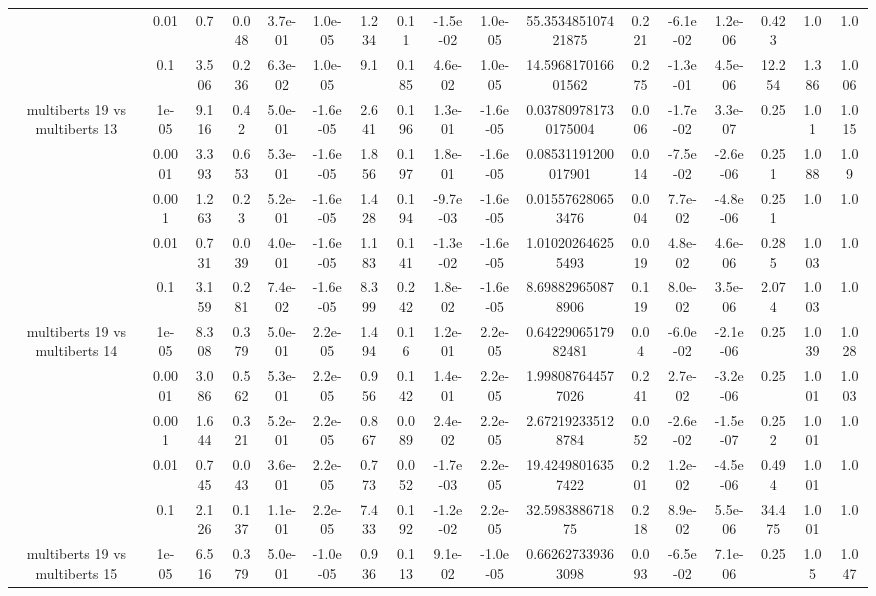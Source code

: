 \begin{tabular}{|c|c|c|c|c|c|c|c|c|c|c|c|c|c|c|c|c|}
 & 0.01 & 0.7 & 0.048 & 3.7e-01 & 1.0e-05 & 1.234 & 0.11 & -1.5e-02 & 1.0e-05 & 55.353485107421875 & 0.221 & -6.1e-02 & 1.2e-06 & 0.423 & 1.0 & 1.0 \\
 & 0.1 & 3.506 & 0.236 & 6.3e-02 & 1.0e-05 & 9.1 & 0.185 & 4.6e-02 & 1.0e-05 & 14.596817016601562 & 0.275 & -1.3e-01 & 4.5e-06 & 12.254 & 1.386 & 1.006 \\
\hline
\multirow{5}{*}{multiberts 19 vs multiberts 13} & 1e-05 & 9.116 & 0.42 & 5.0e-01 & -1.6e-05 & 2.641 & 0.196 & 1.3e-01 & -1.6e-05 & 0.037809781730175004 & 0.006 & -1.7e-02 & 3.3e-07 & 0.25 & 1.01 & 1.015 \\
 & 0.0001 & 3.393 & 0.653 & 5.3e-01 & -1.6e-05 & 1.856 & 0.197 & 1.8e-01 & -1.6e-05 & 0.08531191200017901 & 0.014 & -7.5e-02 & -2.6e-06 & 0.251 & 1.088 & 1.09 \\
 & 0.001 & 1.263 & 0.23 & 5.2e-01 & -1.6e-05 & 1.428 & 0.194 & -9.7e-03 & -1.6e-05 & 0.015576280653476 & 0.004 & 7.7e-02 & -4.8e-06 & 0.251 & 1.0 & 1.0 \\
 & 0.01 & 0.731 & 0.039 & 4.0e-01 & -1.6e-05 & 1.183 & 0.141 & -1.3e-02 & -1.6e-05 & 1.010202646255493 & 0.019 & 4.8e-02 & 4.6e-06 & 0.285 & 1.003 & 1.0 \\
 & 0.1 & 3.159 & 0.281 & 7.4e-02 & -1.6e-05 & 8.399 & 0.242 & 1.8e-02 & -1.6e-05 & 8.698829650878906 & 0.119 & 8.0e-02 & 3.5e-06 & 2.074 & 1.003 & 1.0 \\
\hline
\multirow{5}{*}{multiberts 19 vs multiberts 14} & 1e-05 & 8.308 & 0.379 & 5.0e-01 & 2.2e-05 & 1.494 & 0.16 & 1.2e-01 & 2.2e-05 & 0.6422906517982481 & 0.04 & -6.0e-02 & -2.1e-06 & 0.25 & 1.039 & 1.028 \\
 & 0.0001 & 3.086 & 0.562 & 5.3e-01 & 2.2e-05 & 0.956 & 0.142 & 1.4e-01 & 2.2e-05 & 1.998087644577026 & 0.241 & 2.7e-02 & -3.2e-06 & 0.25 & 1.001 & 1.003 \\
 & 0.001 & 1.644 & 0.321 & 5.2e-01 & 2.2e-05 & 0.867 & 0.089 & 2.4e-02 & 2.2e-05 & 2.672192335128784 & 0.052 & -2.6e-02 & -1.5e-07 & 0.252 & 1.001 & 1.0 \\
 & 0.01 & 0.745 & 0.043 & 3.6e-01 & 2.2e-05 & 0.773 & 0.052 & -1.7e-03 & 2.2e-05 & 19.42498016357422 & 0.201 & 1.2e-02 & -4.5e-06 & 0.494 & 1.001 & 1.0 \\
 & 0.1 & 2.126 & 0.137 & 1.1e-01 & 2.2e-05 & 7.433 & 0.192 & -1.2e-02 & 2.2e-05 & 32.598388671875 & 0.218 & 8.9e-02 & 5.5e-06 & 34.475 & 1.001 & 1.0 \\
\hline
\multirow{5}{*}{multiberts 19 vs multiberts 15} & 1e-05 & 6.516 & 0.379 & 5.0e-01 & -1.0e-05 & 0.936 & 0.113 & 9.1e-02 & -1.0e-05 & 0.662627339363098 & 0.093 & -6.5e-02 & 7.1e-06 & 0.25 & 1.05 & 1.047 \\

\end{tabular}
